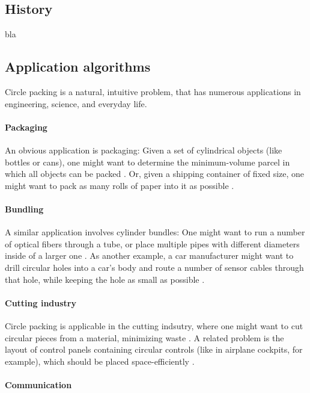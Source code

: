 \documentclass[a4paper,style=print,bibliography=totoc,nexus,lnum,extramargin]{tubsbook}
\begin{document}
\subsection{History}

bla

\subsection{Application algorithms}

Circle packing is a natural, intuitive problem, that has numerous applications in engineering, science, and everyday life.

\paragraph{Packaging}

An obvious application is packaging: Given a set of cylindrical objects (like bottles or cans), one might want to determine the minimum-volume parcel in which all objects can be packed \parencite{CKP2008solving}. Or, given a shipping container of fixed size, one might want to pack as many rolls of paper into it as possible \parencite{fraser1994integrated}.

\paragraph{Bundling}

A similar application involves cylinder bundles:
One might want to run a number of optical fibers through a tube, or place multiple pipes with different diameters inside of a larger one \parencite{WHZX2002improved}. As another example, a car manufacturer might want to drill circular holes into a car's body and route a number of sensor cables through that hole, while keeping the hole as small as possible \cite{SSSKK2004disk}.

\paragraph{Cutting industry}

Circle packing is applicable in the cutting indsutry, where one might want to cut circular pieces from a material, minimizing waste \cite{SMCSCG2007new}.
A related problem is the layout of control panels containing circular controls (like in airplane cockpits, for example), which should be placed space-efficiently \parencite{CKP2008solving}.

\paragraph{Communication}
\end{document}
